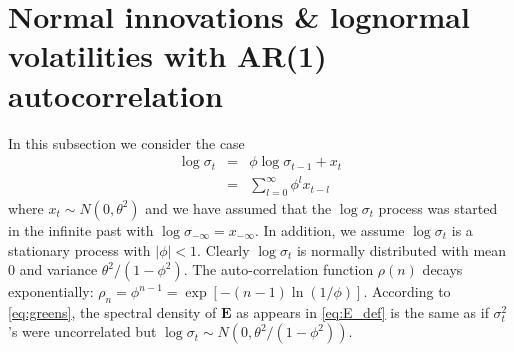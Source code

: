 \documentclass{article}
\begin{document}
\section{Normal innovations \& lognormal volatilities with AR(1)
  autocorrelation}\label{sec:lognormal}
In this subsection we consider the case
\begin{eqnarray}
  \log \sigma_t &=& \phi\log \sigma_{t-1} + x_t \nonumber \\
  &=& \sum_{l = 0}^{\infty} \phi^l x_{t-l} \label{eq:AR}
\end{eqnarray}
where $x_t \sim N(0, \theta^2)$ and we have assumed that the $\log
\sigma_t$ process was started in the infinite past with $\log
\sigma_{-\infty} = x_{-\infty}$. In addition, we assume $\log
\sigma_t$ is a stationary process with $|\phi| < 1$. Clearly $\log
\sigma_t$ is normally distributed with mean 0 and variance ${\theta^2
  / (1 - \phi^2)}$. The auto-correlation function $\rho(n)$ decays
exponentially: $\rho_n = \phi^{n-1} = \exp[-(n-1)\ln(1/\phi)]$.
According to \eqref{eq:greens}, the spectral
density of $\bm E$ as appears in \eqref{eq:E_def} is the same as if
$\sigma_t^2$'s were uncorrelated but $\log \sigma_t \sim N(0,
\theta^2/(1 - \phi^2))$.
\end{document}
